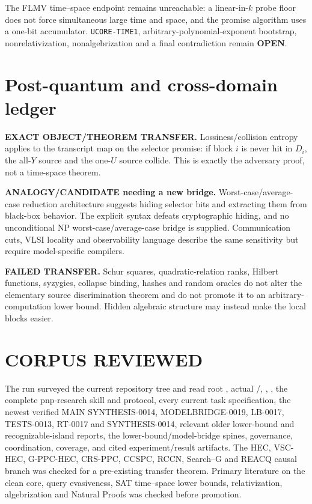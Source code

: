 \documentclass[11pt]{article}
\newcommand{\OPEN}{\textbf{OPEN}}
\begin{document}
The FLMV time--space endpoint remains unreachable: a linear-in-$k$ probe floor
does not force simultaneous large time and space, and the promise algorithm
uses a one-bit accumulator.  \texttt{UCORE-TIME1}, arbitrary-polynomial-exponent
bootstrap, nonrelativization, nonalgebrization and a final contradiction remain
\OPEN.

\section{Post-quantum and cross-domain ledger}

\textbf{EXACT OBJECT/THEOREM TRANSFER.}  Lossiness/collision entropy applies to
the transcript map on the selector promise: if block $i$ is never hit in
$D_i$, the all-$Y$ source and the one-$U$ source collide.  This is exactly the
adversary proof, not a time-space theorem.

\textbf{ANALOGY/CANDIDATE needing a new bridge.}  Worst-case/average-case
reduction architecture suggests hiding selector bits and extracting them from
black-box behavior.  The explicit syntax defeats cryptographic hiding, and no
unconditional NP worst-case/average-case bridge is supplied.  Communication
cuts, VLSI locality and observability language describe the same sensitivity
but require model-specific compilers.

\textbf{FAILED TRANSFER.}  Schur squares, quadratic-relation ranks, Hilbert
functions, syzygies, collapse binding, hashes and random oracles do not alter
the elementary source discrimination theorem and do not promote it to an
arbitrary-computation lower bound.  Hidden algebraic structure may instead
make the local blocks easier.

\section{CORPUS REVIEWED}

The run surveyed the current repository tree and read root ,
actual /, , ,
the complete pnp-research skill and protocol, every current task specification,
the newest verified MAIN SYNTHESIS-0014, MODELBRIDGE-0019, LB-0017,
TESTS-0013, RT-0017 and SYNTHESIS-0014, relevant older lower-bound and
recognizable-island reports, the lower-bound/model-bridge spines, governance,
coordination, coverage, and cited experiment/result artifacts.  The HEC,
VSC-HEC, G-PPC-HEC, CRS-PPC, CCSPC, RCCN, Search--G and REACQ causal branch
was checked for a pre-existing transfer theorem.  Primary literature on the
clean core, query evasiveness, SAT time--space lower bounds, relativization,
algebrization and Natural Proofs was checked before promotion.
\end{document}
